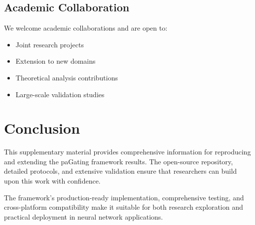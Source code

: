 \documentclass[journal]{IEEEtran}
\begin{document}
\subsection{Academic Collaboration}
We welcome academic collaborations and are open to:
\begin{itemize}
    \item Joint research projects
    \item Extension to new domains
    \item Theoretical analysis contributions
    \item Large-scale validation studies
\end{itemize}

\section{Conclusion}

This supplementary material provides comprehensive information for reproducing and extending the paGating framework results. The open-source repository, detailed protocols, and extensive validation ensure that researchers can build upon this work with confidence.

The framework's production-ready implementation, comprehensive testing, and cross-platform compatibility make it suitable for both research exploration and practical deployment in neural network applications.
\end{document}
